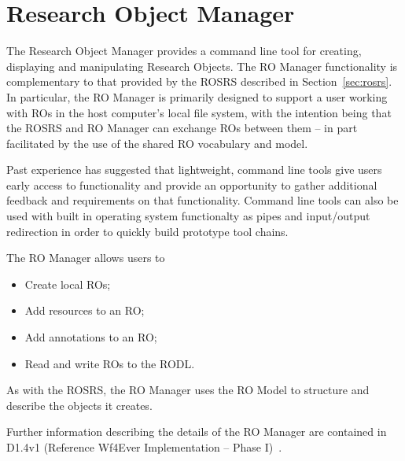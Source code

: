 \section{Research Object Manager}
\label{sec:manager}

The Research Object Manager provides a command line tool for creating, displaying and manipulating Research Objects. The RO Manager functionality is complementary to that provided by the ROSRS described in Section~\ref{sec:rosrs}. In particular, the RO Manager is primarily designed to support a user working with ROs in the host computer's local file system, with the intention being that the ROSRS and RO Manager can exchange ROs between them -- in part facilitated by the use of the shared RO vocabulary and model.

Past experience has suggested that lightweight, command line tools give users early access to functionality and provide an opportunity to gather additional feedback and requirements on that functionality. Command line tools can also be used with built in operating system functionalty as pipes and input/output redirection in order to quickly build prototype tool chains.

The RO Manager allows users to 
\begin{itemize}
\item Create local ROs;
\item Add resources to an RO;
\item Add annotations to an RO;
\item Read and write ROs to the RODL.
\end{itemize}

As with the ROSRS, the RO Manager uses the RO Model to structure and describe the objects it creates.

Further information describing the details of the RO Manager are contained in D1.4v1 (Reference Wf4Ever Implementation -- Phase I)~\cite{D1.4v1}.

